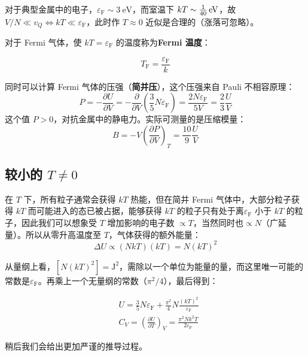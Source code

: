 对于典型金属中的电子，$\varepsilon_\mathrm{F}\sim \qty{3}{\electronvolt}$，而室温下 $kT\sim \qty[parse-numbers=false]{\tfrac{1}{40}}{\electronvolt}$，故 $V/N\ll v_Q\iff kT\ll \varepsilon_\mathrm{F}$，此时作 $T\approx 0$ 近似是合理的（涨落可忽略）。

对于 Fermi 气体，使 $kT=\varepsilon_\mathrm{F}$ 的温度称为\textbf{Fermi 温度}：
\begin{definition}[Fermi 温度]
    \begin{equation}
        T_\mathrm{F}=\frac{\varepsilon_\mathrm{F}}{k}
    \end{equation}
\end{definition}
同时可以计算 Fermi 气体的压强（\textbf{简并压}），这个压强来自 Pauli 不相容原理：
\begin{equation}
    P=-\frac{\partial U}{\partial V}
    =-\frac{\partial}{\partial V}\left(\frac{3}{5}N\varepsilon_\mathrm{F}\right)
    =\frac{2N\varepsilon_\mathrm{F}}{5V}=\frac{2}{3}\frac{U}{V}
\end{equation}
这个值 $P>0$，对抗金属中的静电力。实际可测量的是压缩模量：
\begin{equation}
    B=-V\left(\frac{\partial P}{\partial V}\right)_T=\frac{10}{9}\frac{U}{V}
\end{equation}

\subsection{较小的 $T\neq 0$}
在 $T$ 下，所有粒子通常会获得 $kT$ 热能，但在简并 Fermi 气体中，大部分粒子获得 $kT$ 而可能进入的态已被占据，能够获得 $kT$ 的粒子只有处于离$\varepsilon_\mathrm{F}$ 小于 $kT$ 的粒子，因此我们可以想象受 $T$ 增加影响的电子数 $\propto T$，当然同时也$\propto N$（广延量）。所以从零升高温度至 $T$，气体获得的额外能量：
\begin{equation}
    \Delta U\propto (NkT)(kT)=N(kT)^2
\end{equation}

从量纲上看，$[N(kT)^2]=\mathrm{J}^2$，需除以一个单位为能量的量，而这里唯一可能的常数是$\varepsilon_\mathrm{F}$。再乘上一个无量纲的常数（$\pi^2/4$），最后得到：
\begin{corollary}
    \begin{align}
        &U=\frac{3}{5}N\varepsilon_\mathrm{F}+\frac{\pi^2}{4}N\frac{(kT)^2}{\varepsilon_\mathrm{F}}\\
        &C_V=\left(\frac{\partial U}{\partial T}\right)_V=\frac{\pi^2Nk^2T}{2\varepsilon_\mathrm{F}}
    \end{align}
\end{corollary}
稍后我们会给出更加严谨的推导过程。

